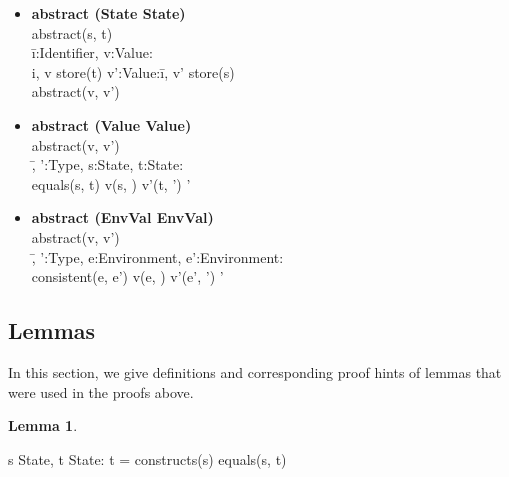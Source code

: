 \documentclass[conference]{IEEEtran}
\newtheorem{lem}{Lemma}
\begin{document}
\begin{itemize}
\item \begin{tabbing}\textbf{abstract  (State  State)}
\\abstract(s, t) 
\\ \=i:Identifier, v:Value: 
\\\>i, v  store(t)   v':Value:\= i, v'  store(s)  
\\\>\>abstract(v, v')
\end{tabbing}
\item \begin{tabbing}\textbf{abstract  (Value  Value)}
\\abstract(v, v')  
\\ \=, ':Type, s:State, t:State: 
\\\>equals(s, t)  \textlbrackdbl v\textrbrackdbl(s, )  \textlbrackdbl v'\textrbrackdbl(t, ')  \textlbrackdbl '\textrbrackdbl  \textlbrackdbl \textrbrackdbl
\end{tabbing}
\item \begin{tabbing}\textbf{abstract  (EnvVal  EnvVal)}
\\abstract(v, v') 
\\ \=, ':Type, e:Environment, e':Environment: 
\\\>consistent(e, e')  \textlbrackdbl v\textrbrackdbl(e, )  \textlbrackdbl v'\textrbrackdbl(e', ')  \textlbrackdbl '\textrbrackdbl  \textlbrackdbl \textrbrackdbl
\end{tabbing}
\end{itemize}

\subsection{Lemmas}\label{subsec:lemmas}
In this section, we give definitions and corresponding proof hints of lemmas that were used in the proofs above.

\begin{lem} \end{lem}
\begin{tabbing} s  State, t  State: t = constructs(s)  equals(s, t) \end{tabbing} 
\end{document}
